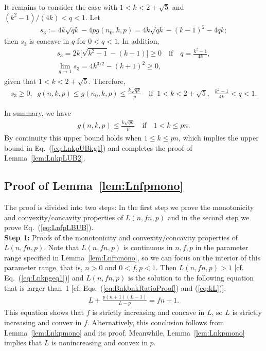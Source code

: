 \documentclass[aop]{imsart}
\theoremstyle{plain}
\theoremstyle{remark}
\newcommand{\1}{\operatorname{\uppercase\expandafter{\romannumeral1}}}
\newcommand{\2}{\operatorname{\uppercase\expandafter{\romannumeral2}}}
\newcommand{\3}{\operatorname{\uppercase\expandafter{\romannumeral3}}}
\newcommand{\4}{\operatorname{\uppercase\expandafter{\romannumeral4}}}
\newcommand{\5}{\operatorname{\uppercase\expandafter{\romannumeral5}}}
\newcommand{\6}{\operatorname{\uppercase\expandafter{\romannumeral6}}}
\newcommand{\7}{\operatorname{\uppercase\expandafter{\romannumeral7}}}
\newcommand{\8}{\operatorname{\uppercase\expandafter{\romannumeral8}}}
\newcommand{\9}{\operatorname{\uppercase\expandafter{\romannumeral9}}}
\newcommand{\eref}[1]{Eq.~\textup{(\ref{#1})}}
\newcommand{\eqsref}[2]{Eqs.~(\ref{#1}) and (\ref{#2})}
\newcommand{\lref}[1]{Lemma~\ref{#1}}
\begin{document}
\begin{appendix}
	It remains to consider the case with $1<k< 2+\sqrt{5}$ and  $(k^2-1)/(4k)<q<1$. Let 
	\begin{align}
	s_3:=4k\sqrt{q k}-4p g(n_0,k,p )=4k\sqrt{q k}-(k-1)^2-4q k; 
	\end{align}
	then $s_3$ is concave in $q$ for $0<q <1$. In addition,
	\begin{gather}
	s_3=2k\bigl[\sqrt{k^2-1}-(k-1)\bigr]\geq 0 \quad \mbox{if} \quad  q=\frac{k^2-1}{4k}, \\
	\lim_{q\rightarrow 1} s_3=4k^{3/2}-(k+1)^2\geq 0,
	\end{gather}
	given that $1<k< 2+\sqrt{5}$. Therefore, 
	\begin{align}
	s_3\geq 0, \;\; g(n,k,p)\leq g(n_0,k,p)\leq \frac{k\sqrt{q k}}{p}\quad \mbox{if} \;\; 1<k< 2+\sqrt{5},\;\;  \frac{k^2-1}{4k}< q <1. 
	\end{align}

	In summary, we have
	\begin{align}
	g(n,k,p)\leq  \frac{k\sqrt{q k}}{p} \quad \mbox{if} \quad 1< k\leq p n. 
	\end{align}
By continuity this upper bound holds  when $1\leq k\leq pn$, which implies the upper bound in  \eref{eq:LnkpUBkg1} and  completes the proof of \lref{lem:LnkpLUB2}. 


\subsection{Proof of \lref{lem:Lnfpmono}}
The proof is divided into two steps: In the first step we prove the monotonicity and convexity/concavity properties of $L(n,f n,p)$ and in the second step we prove \eref{eq:LnfpLBUB}. \\

\textbf{Step 1:} Proofs of the monotonicity and convexity/concavity properties of $L(n,f n,p)$. Note that $L(n,f n,p)$ is continuous in $n,f,p$  in the parameter range specified in \lref{lem:Lnfpmono}, so we can focus on the interior of this parameter range, that is, $n>0$ and $0<f,p<1$. Then  $L(n,f n,p)> 1$ [cf. \eref{eq:Lnkpgeq1}]  and $L(n,f n,p)$ is the solution to the following equation that is larger than~1 [cf. \eqsref{eq:BnkbnkRatioProof}{eq:kL}],
	\begin{align}
	L+\frac{p(n+1)(L-1)}{L-p}=f n+1. \label{eq:fnL}
	\end{align} 
	This equation shows that $f$ is strictly increasing and concave in $L$, so $L$ is strictly increasing and convex in $f$.  Alternatively, this conclusion follows from \lref{lem:Lnkpmono} and its proof. Meanwhile, \lref{lem:Lnkpmono} implies that 	$L$ is nonincreasing and convex in $p$.
	

\end{appendix}
\end{document}

